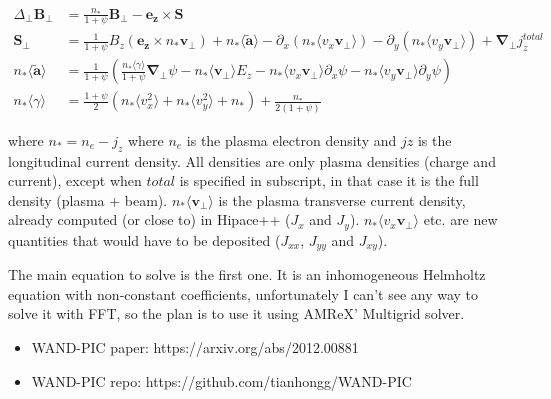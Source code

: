 \documentclass{article}
\begin{document}
\begin{subequations}
\begin{align}
\Delta_\perp \bm{B_\perp} &= \frac{n_*}{1+\psi} \bm{B_\perp} - \bm{e_z} \times \bm{S} \\
\bm{S}_\perp &= \frac{1}{1+\psi} B_z \left( \bm{e_z} \times n_* \bm{v_\perp} \right) + n_* \langle \bm{\tilde{a}} \rangle - \partial_x\left( n_*\langle v_x\bm{v_\perp} \rangle \right) - \partial_y\left( n_*\langle v_y\bm{v_\perp} \rangle \right) + \bm{\nabla_\perp}j_z^{total} \\
n_* \langle \bm{\tilde{a}} \rangle &= \frac{1}{1+\psi} \left(  \frac{n_*\langle\gamma\rangle}{1+\psi}\bm{\nabla_\perp}\psi - n_* \langle \bm{v_\perp} \rangle E_z - n_* \langle v_x\bm{v_\perp}\rangle \partial_x\psi - n_* \langle v_y\bm{v_\perp}\rangle \partial_y\psi \right) \\
n_*\langle \gamma\rangle &= \frac{1+\psi}{2}\left(n_*\langle v_x^2\rangle + n_*\langle v_y^2\rangle + n_*\right) + \frac{n_*}{2(1+\psi)}
\end{align}
\end{subequations}

where $n_* = n_e - j_z$ where $n_e$ is the plasma electron density and $jz$ is the longitudinal current density. All densities are only plasma densities (charge and current), except when $total$ is specified in subscript, in that case it is the full density (plasma + beam). $n_*\langle \bm{v_\perp}\rangle$ is the plasma transverse current density, already computed (or close to) in Hipace++ ($J_x$ and $J_y$). $n_*\langle v_x\bm{v_\perp}\rangle$ etc. are new quantities that would have to be deposited ($J_{xx}$, $J_{yy}$ and $J_{xy}$).

The main equation to solve is the first one. It is an inhomogeneous Helmholtz equation with non-constant coefficients, unfortunately I can't see any way to solve it with FFT, so the plan is to use it using AMReX' Multigrid solver.

\begin{itemize}
\item WAND-PIC paper: https://arxiv.org/abs/2012.00881
\item WAND-PIC repo: https://github.com/tianhongg/WAND-PIC
\end{itemize}
\end{document}
